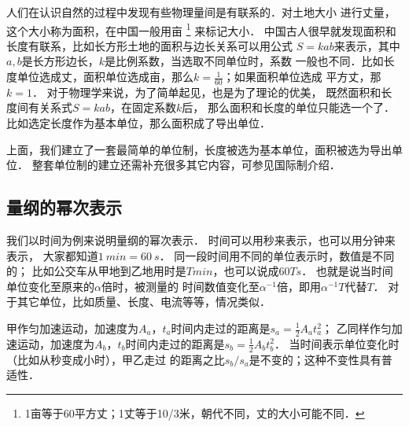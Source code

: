 人们在认识自然的过程中发现有些物理量间是有联系的．对土地大小
进行丈量，这个大小称为{\kaishu 面积}，在中国一般用{\kaishu 亩}
{\footnote{1亩等于60平方丈；1丈等于10/3米，朝代不同，{\kaishu 丈}的大小可能不同．}}
来标记大小．
中国古人很早就发现面积和长度有联系，比如长方形土地的面积与边长关系可以用公式
$S=kab$来表示，其中$a,b$是长方形边长，$k$是比例系数，当选取不同单位时，系数
一般也不同．比如长度单位选成丈，面积单位选成亩，那么$k=\frac{1}{60}$；如果面积单位选成
{\kaishu 平方丈}，那$k=1$．
对于物理学来说，为了简单起见，也是为了理论的优美，
既然面积和长度间有关系式$S=kab$，在固定系数$k$后，
那么面积和长度的单位只能选一个了．
比如选定长度作为基本单位，那么面积成了{\heiti 导出单位}．

上面，我们建立了一套最简单的单位制，长度被选为基本单位，面积被选为导出单位．
整套单位制的建立还需补充很多其它内容，可参见国际制介绍．



\subsection{量纲的幂次表示}
我们以时间为例来说明量纲的幂次表示\cite[\S 1.4]{sedov1982}．
时间可以用{\kaishu 秒}来表示，也可以用{\kaishu 分钟}来表示，
大家都知道$\SI{1}{min}=\SI{60}{s}$．
同一段时间用不同的单位表示时，数值是不同的；
比如公交车从甲地到乙地用时是$T\si{min}$，也可以说成$60T\si{s}$．
也就是说当时间单位变化至原来的$\alpha$倍时，被测量的
时间数值变化至$\alpha^{-1}$倍，即用$\alpha^{-1}T$代替$T$．
对于其它单位，比如质量、长度、电流等等，情况类似．

甲作匀加速运动，加速度为$A_a$，$t_{a}$时间内走过的距离是$s_a=\frac{1}{2}A_a t_a^2$；
乙同样作匀加速运动，加速度为$A_b$，$t_{b}$时间内走过的距离是$s_b=\frac{1}{2}A_b t_b^2$．
当时间表示单位变化时（比如从{\kaishu 秒}变成{\kaishu 小时}），甲乙走过
的距离之比$s_b/s_a$是不变的；这种不变性具有普适性．


